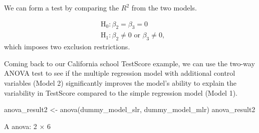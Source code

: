 \documentclass[
  12pt,
  letterpaper,
]{scrbook}
\newenvironment{Shaded}{\begin{snugshade}}{\end{snugshade}}
\newcommand{\FunctionTok}[1]{\textcolor[rgb]{0.28,0.35,0.67}{#1}}
\newcommand{\NormalTok}[1]{\textcolor[rgb]{0.00,0.23,0.31}{#1}}
\newcommand{\OtherTok}[1]{\textcolor[rgb]{0.00,0.23,0.31}{#1}}
\theoremstyle{plain}
\theoremstyle{definition}
\theoremstyle{remark}
\begin{document}
We can form a test by comparing the \(R^2\) from the two models.

\[
\begin{aligned}
&\text{H}_0: \beta_2 = \beta_3 = 0 \\
&\text{H}_1: \beta_2 \ne 0 \text{ or } \beta_3\ne 0 ,
\end{aligned}
\] which imposes two exclusion restrictions.

Coming back to our California school TestScore example, we can use the
two-way ANOVA test to see if the multiple regression model with
additional control variables (Model 2) significantly improves the
model's ability to explain the variability in TestScore compared to the
simple regression model (Model 1).

\begin{Shaded}
\begin{Highlighting}[]
\NormalTok{anova\_result2 }\OtherTok{\textless{}{-}} \FunctionTok{anova}\NormalTok{(dummy\_model\_slr, dummy\_model\_mlr)}
\NormalTok{anova\_result2}
\end{Highlighting}
\end{Shaded}

A anova: 2 × 6
\end{document}

